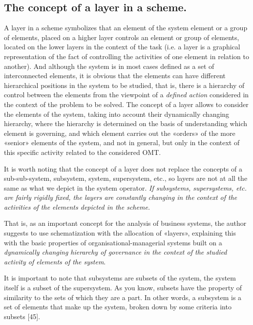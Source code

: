 \documentclass[11pt,a4paper]{book}
\begin{document}
\subsection{The concept of a layer in a scheme.}

A layer in a scheme symbolizes that an element of the system element or a
group of elements, placed on a higher layer controls an element or group of
elements, located on the lower layers in the context of the task (i.e. a layer
is a graphical representation of the fact of controlling the activities of one
element in relation to another).  And although the system is in most cases
defined as a set of interconnected elements, it is obvious that the elements
can have different hierarchical positions in the system to be studied, that
is, there is a hierarchy of control between the elements from the viewpoint of
a \emph{defined action} considered in the context of the problem to be solved.
The concept of a layer allows to consider the elements of the system, taking
into account their dynamically changing hierarchy, where the hierarchy is
determined on the basis of understanding which element is governing, and which
element carries out the «orders» of the more «senior» elements of the system,
and not in general, but only in the context of this specific activity related
to the considered OMT.

It is worth noting that the concept of a layer does not replace the concepts
of a sub-sub-system, subsystem, system, supersystem, etc., so layers are not
at all the same as what we depict in the system operator.  \emph{If
  subsystems, supersystems, etc. are fairly rigidly fixed, the layers are
  constantly changing in the context of the activities of the elements
  depicted in the scheme.}

That is, as an important concept for the analysis of business systems, the
author suggests to use schematization with the allocation of «layers»,
explaining this with the basic properties of organisational-managerial systems
built on a \emph{dynamically changing hierarchy of governance in the context
  of the studied activity of elements of the system}.

It is important to note that subsystems are subsets of the system, the system
itself is a subset of the supersystem. As you know, subsets have the property
of similarity to the sets of which they are a part. In other words, a
subsystem is a set of elements that make up the system, broken down by some
criteria into subsets [45].
\end{document}
